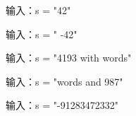 输入：s = "42"

输入：s = "   -42"

输入：s = "4193 with words"

输入：s = "words and 987"

输入：s = "-91283472332"
